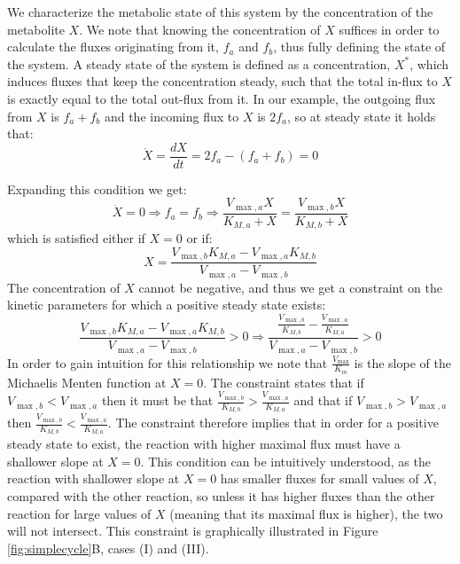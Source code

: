     We characterize the metabolic state of this system by the concentration of the metabolite $X$.
    We note that knowing the concentration of $X$ suffices in order to calculate the fluxes originating from it, $f_a$ and $f_b$, thus fully defining the state of the system.
    A steady state of the system is defined as a concentration, $X^*$, which induces fluxes that keep the concentration steady, such that the total in-flux to $X$ is exactly equal to the total out-flux from it.
    In our example, the outgoing flux from $X$ is $f_a+f_b$ and the incoming flux to $X$ is $2f_a$, so at steady state it holds that:
    \begin{equation}
      \label{eq:xdyna}
      \dot X = \frac{dX}{dt} = 2f_a - (f_a + f_b) = 0
    \end{equation}

    Expanding this condition we get:
    \begin{equation*}
      \dot X = 0 \Rightarrow f_a = f_b \Rightarrow \frac{V_{\max,a}X}{K_{M,a}+X}=\frac{V_{\max,b}X}{K_{M,b}+X}
    \end{equation*}
    which is satisfied either if $X=0$ or if:
    \begin{equation}
      \label{eq:xstst}
      X=\frac{V_{\max,b}K_{M,a}-V_{\max,a}K_{M,b}}{V_{\max,a}-V_{\max,b}}
    \end{equation}
    The concentration of $X$ cannot be negative, and thus we get a constraint on the kinetic parameters for which a positive steady state exists:
    \begin{equation*}
      \frac{V_{\max,b}K_{M,a}-V_{\max,a}K_{M,b}}{V_{\max,a}-V_{\max,b}}>0 \Rightarrow \frac{\frac{V_{\max,b}}{K_{M,b}}-\frac{V_{\max,a}}{K_{M,a}}}{V_{\max,a}-V_{\max,b}}>0
    \end{equation*}
    In order to gain intuition for this relationship we note that $\frac{V_{\max}}{K_m}$ is the slope of the Michaelis Menten function at $X=0$.
    The constraint states that if $V_{\max,b}<V_{\max,a}$ then it must be that $\frac{V_{\max,b}}{K_{M,b}}>\frac{V_{\max,a}}{K_{M,a}}$ and that if $V_{\max,b}>V_{\max,a}$ then $\frac{V_{\max,b}}{K_{M,b}}<\frac{V_{\max,a}}{K_{M,a}}$.
    The constraint therefore implies that in order for a positive steady state to exist, the reaction with higher maximal flux must have a shallower slope at $X=0$.
    This condition can be intuitively understood, as the reaction with shallower slope at $X=0$ has smaller fluxes for small values of $X$, compared with the other reaction, so unless it has higher fluxes than the other reaction for large values of $X$ (meaning that its maximal flux is higher), the two will not intersect.
    This constraint is graphically illustrated in Figure \ref{fig:simplecycle}B, cases (I) and (III).

